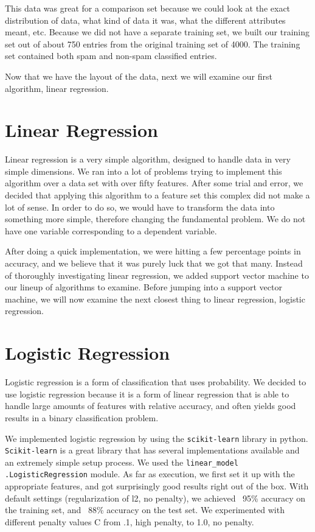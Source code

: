 \documentclass{article} %
\begin{document}
This data was great for a comparison set because we could look at the exact distribution
of data, what kind of data it was, what the different attributes meant, etc. Because we
did not have a separate training set, we built our training set out of about 750 entries
from the original training set of 4000. The training set contained both spam and non-spam
classified entries.

Now that we have the layout of the data, next we will examine our first algorithm,
linear regression.

\section{Linear Regression}
Linear regression is a very simple algorithm, designed to handle data in very simple
dimensions. We ran into a lot of problems trying to implement this algorithm over
a data set with over fifty features. After some trial and error, we decided that
applying this algorithm to a feature set this complex did not make a lot of sense.
In order to do so, we would have to transform the data into something more simple,
therefore changing the fundamental problem. We do not have one variable corresponding
to a dependent variable.

After doing a quick implementation, we were hitting a few percentage points in accuracy,
and we believe that it was purely luck that we got that many. Instead of thoroughly
investigating linear regression, we added support vector machine to our lineup of
algorithms to examine. Before jumping into a support vector machine, we will now
examine the next closest thing to linear regression, logistic regression.

\section{Logistic Regression}
Logistic regression is a form of classification that uses probability. We decided
to use logistic regression because it is a form of linear regression that is able
to handle large amounts of features with relative accuracy, and often yields good
results in a binary classification problem.

We implemented logistic regression by using the \texttt{scikit-learn} library
in python. \texttt{Scikit-learn} is a great library that has several implementations
available and an extremely simple setup process. We used the \texttt{linear\_model}
\texttt{.LogisticRegression} module. As far as execution, we first set it up with
the appropriate features, and got surprisingly good results right out of the box.
With default settings (regularization of l2, no penalty), we achieved
~95\% accuracy on the training set, and ~88\% accuracy on the test set. We
experimented with different penalty values C from .1, high penalty,
to 1.0, no penalty.
\end{document}
